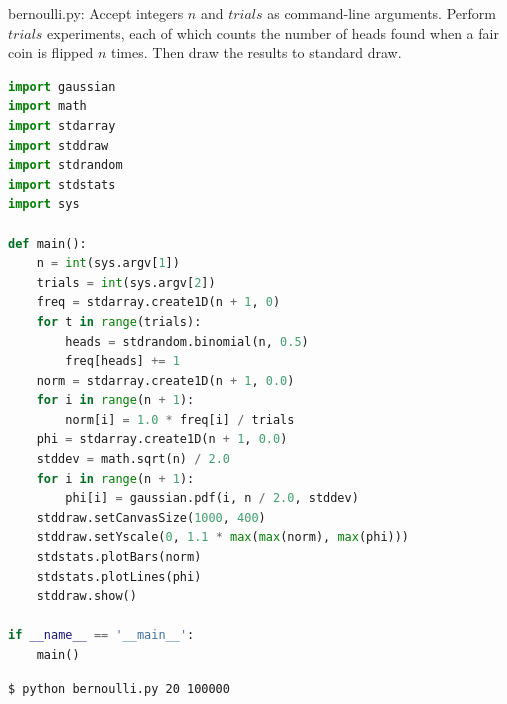 \documentclass[8pt,a4paper,compress]{beamer}
\begin{document}
\begin{frame}[fragile]
\pause

\begin{framed}
\tiny bernoulli.py: Accept integers $n$ and $trials$ as command-line arguments. Perform $trials$ experiments, each of which counts the number of heads found when a fair coin is flipped $n$ times. Then draw the results to standard draw. 
\end{framed}

\begin{lstlisting}[language=Python]
import gaussian
import math
import stdarray
import stddraw
import stdrandom
import stdstats
import sys

def main():
    n = int(sys.argv[1])
    trials = int(sys.argv[2])
    freq = stdarray.create1D(n + 1, 0)
    for t in range(trials):
        heads = stdrandom.binomial(n, 0.5)
        freq[heads] += 1
    norm = stdarray.create1D(n + 1, 0.0)
    for i in range(n + 1):
        norm[i] = 1.0 * freq[i] / trials
    phi = stdarray.create1D(n + 1, 0.0)
    stddev = math.sqrt(n) / 2.0
    for i in range(n + 1):
        phi[i] = gaussian.pdf(i, n / 2.0, stddev)
    stddraw.setCanvasSize(1000, 400)
    stddraw.setYscale(0, 1.1 * max(max(norm), max(phi)))
    stdstats.plotBars(norm)
    stdstats.plotLines(phi)
    stddraw.show()

if __name__ == '__main__':
    main()
\end{lstlisting}
\end{frame}

\begin{frame}[fragile]
\pause

\begin{minipage}{160pt}
\begin{lstlisting}[language={}]
$ python bernoulli.py 20 100000
\end{lstlisting}
\end{minipage}%
\begin{minipage}{140pt}
\hfill {}
\end{minipage}
\end{frame}
\end{document}
